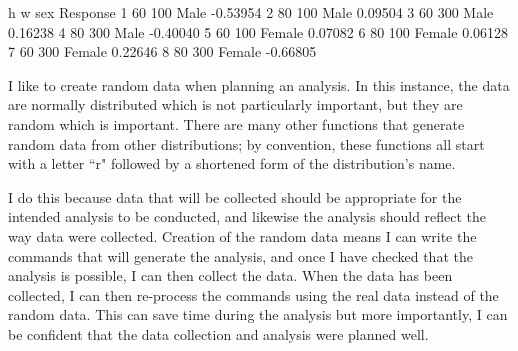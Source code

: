 \begin{Schunk}
\begin{Soutput}
   h   w    sex Response
1 60 100   Male -0.53954
2 80 100   Male  0.09504
3 60 300   Male  0.16238
4 80 300   Male -0.40040
5 60 100 Female  0.07082
6 80 100 Female  0.06128
7 60 300 Female  0.22646
8 80 300 Female -0.66805
\end{Soutput}
\end{Schunk}

 
I like to create random data when planning an analysis. In this instance, the data are normally distributed which is not particularly important, but they are random which is important. There are many other functions that generate random data from other distributions; by convention, these functions all start with a letter ``r" followed by a shortened form of the distribution's name.  
 
I do this because data that will  be collected should be appropriate for the intended analysis to be conducted, and likewise the analysis should reflect the way data were collected. Creation of the random data means I can write the \R{} commands that will generate the analysis, and once I have checked that the analysis is possible, I can then collect the data. When the data has been collected, I can then re-process the commands using the real data instead of the  random data. This can save time during the analysis but more importantly, I can be confident that the data collection and analysis were planned well. 
 
 



